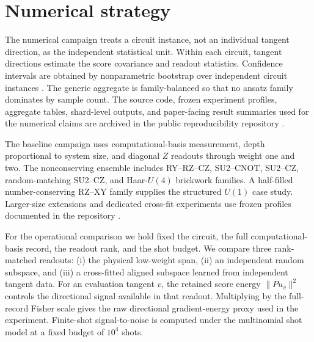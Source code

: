 \documentclass[aps,prx,reprint,superscriptaddress,nofootinbib,longbibliography]{revtex4-2}
\begin{document}
\section{Numerical strategy}

The numerical campaign treats a circuit instance, not an individual tangent direction, as the independent statistical unit. Within each circuit, tangent directions estimate the score covariance and readout statistics. Confidence intervals are obtained by nonparametric bootstrap over independent circuit instances \cite{Efron1979}. The generic aggregate is family-balanced so that no ansatz family dominates by sample count. The source code, frozen experiment profiles, aggregate tables, shard-level outputs, and paper-facing result summaries used for the numerical claims are archived in the public reproducibility repository \cite{AitHaddou2026MeasurementAccessible}.

The baseline campaign uses computational-basis measurement, depth proportional to system size, and diagonal $Z$ readouts through weight one and two. The nonconserving ensemble includes RY--RZ--CZ, SU2--CNOT, SU2--CZ, random-matching SU2--CZ, and Haar-$U(4)$ brickwork families. A half-filled number-conserving RZ--XY family supplies the structured $U(1)$ case study. Larger-size extensions and dedicated cross-fit experiments use frozen profiles documented in the repository \cite{AitHaddou2026MeasurementAccessible}.

For the operational comparison we hold fixed the circuit, the full computational-basis record, the readout rank, and the shot budget. We compare three rank-matched readouts: (i) the physical low-weight span, (ii) an independent random subspace, and (iii) a cross-fitted aligned subspace learned from independent tangent data. For an evaluation tangent $v$, the retained score energy $\|P u_v\|^2$ controls the directional signal available in that readout. Multiplying by the full-record Fisher scale gives the raw directional gradient-energy proxy used in the experiment. Finite-shot signal-to-noise is computed under the multinomial shot model at a fixed budget of $10^4$ shots.
\end{document}
